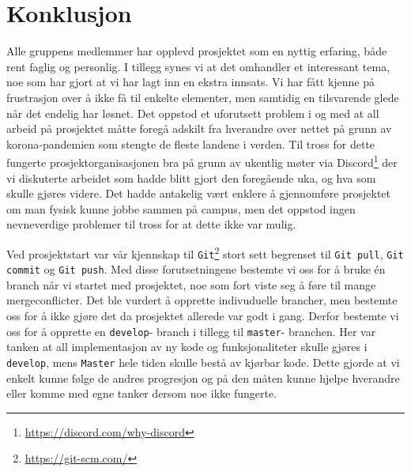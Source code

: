 \newpage
\section{Konklusjon}
Alle gruppens medlemmer har opplevd prosjektet som en nyttig erfaring, både rent faglig og personlig. I tillegg synes vi at det omhandler et interessant tema, noe som har gjort at vi har lagt inn en ekstra innsats. Vi har fått kjenne på frustrasjon over å ikke få til enkelte elementer, men samtidig en tilsvarende glede når det endelig har løsnet. Det oppstod et uforutsett problem i og med at all arbeid på prosjektet måtte foregå adskilt fra hverandre over nettet på grunn av korona-pandemien som stengte de fleste landene i verden. Til tross for dette fungerte prosjektorganisasjonen bra på grunn av ukentlig møter via Discord\footnote{\url{https://discord.com/why-discord}} der vi diskuterte arbeidet som hadde blitt gjort den foregående uka, og hva som skulle gjøres videre. Det hadde antakelig vært enklere å gjennomføre prosjektet om man fysisk kunne jobbe sammen på campus, men det oppstod ingen nevneverdige problemer til tross for at dette ikke var mulig.

Ved prosjektstart var vår kjennskap til \texttt{Git}\footnote{\url{https://git-scm.com/}} stort sett begrenset til \texttt{Git pull}, \texttt{Git commit} og \texttt{Git push}. Med disse forutsetningene bestemte vi oss for å bruke én branch når vi startet med prosjektet, noe som fort viste seg å føre til mange mergeconflicter. Det ble vurdert å opprette indivuduelle brancher, men bestemte oss for å ikke gjøre det da prosjektet allerede var godt i gang. Derfor bestemte vi oss for å opprette en \texttt{develop}- branch i tillegg til \texttt{master}- branchen. Her var tanken at all implementasjon av ny kode og funksjonaliteter skulle gjøres i \texttt{develop}, mens \texttt{Master} hele tiden skulle bestå av kjørbar kode. Dette gjorde at vi enkelt kunne følge de andres progresjon og på den måten kunne hjelpe hverandre eller komme med egne tanker dersom noe ikke fungerte.

